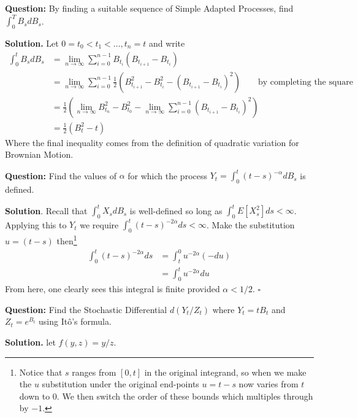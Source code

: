 \documentclass{article}
\begin{document}
\begin{tcolorbox}[colframe=black,colback=gray!5,boxrule=0.5pt]
\textbf{Question:} By finding a suitable sequence of Simple Adapted Processes, find $\int_0^T B_s dB_s$. \cite{Fima}
\end{tcolorbox}
\textbf{Solution.} Let $0=t_0<t_1<\dots,t_n=t$ and write
\begin{align*}
    \int_0^tB_sdB_s &= \lim_{n\to\infty}\sum_{i=0}^{n-1}B_{t_i}(B_{t_{i+1}} - B_{t_i}) \\
    &= \lim_{n\to\infty}\sum_{i=0}^{n-1}\frac{1}{2}(B_{t_{i+1}}^2 - B_{t_i}^2 - (B_{t_{i+1}} - B_{t_i})^2) \quad\quad \text{by completing the square} \\
    &= \frac{1}{2}\left(\lim_{n\to\infty}B_{t_{n}}^2 - B_{t_0}^2 - \lim_{n\to\infty}\sum_{i=0}^{n-1}(B_{t_{i+1}} - B_{t_i})^2\right) \\
    &= \frac{1}{2}(B_t^2-t)
\end{align*}
Where the final inequality comes from the definition of quadratic variation for Brownian Motion. 


\begin{tcolorbox}[colframe=black,colback=gray!5,boxrule=0.5pt]
\textbf{Question:} Find the values of $\alpha$ for which the process $Y_t = \int_0^t(t-s)^{-\alpha}dB_s$ is defined.
\end{tcolorbox}
\textbf{Solution}. Recall that $\int_0^t X_sdB_s$ is well-defined so long as $\int_0^t E[X_s^2]ds<\infty$. Applying this to $Y_t$ we require $\int_0^t(t-s)^{-2\alpha}ds <\infty$. Make the substitution $u = (t-s)$ then\footnote{Notice that $s$ ranges from $[0,t]$ in the original integrand, so when we make the $u$ substitution under the original end-points $u = t-s$ now varies from $t$ down to $0$. We then switch the order of these bounds which multiples through by $-1$.}
\begin{align*}
    \int_0^t(t-s)^{-2\alpha}ds &= \int_t^0 u^{-2\alpha}(-du) \\
    &= \int_0^tu^{-2\alpha}du
\end{align*}
From here, one clearly sees this integral is finite provided $\alpha < 1/2.$ $\square$

\begin{tcolorbox}[colframe=black,colback=gray!5,boxrule=0.5pt]
\textbf{Question:} Find the Stochastic Differential $d(Y_t / Z_t)$ where $Y_t = tB_t$ and $Z_t=e^{B_t}$ using Itô's formula. \cite{Fima}
\end{tcolorbox}
\textbf{Solution.} let $f(y,z) = y/z$. 
\end{document}

